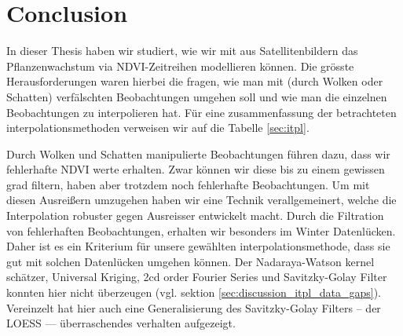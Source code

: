 \chapter{Conclusion}
\label{sec:Conclusion}

In dieser Thesis haben wir studiert, wie wir mit aus Satellitenbildern das Pflanzenwachstum via NDVI-Zeitreihen modellieren können. Die grösste Herausforderungen waren hierbei die fragen, wie man mit (durch Wolken oder Schatten) verfälschten Beobachtungen umgehen soll und wie man die einzelnen Beobachtungen zu interpolieren hat. 
Für eine zusammenfassung der betrachteten interpolationsmethoden verweisen wir auf die Tabelle \ref{sec:itpl}. 

    Durch Wolken und Schatten manipulierte Beobachtungen führen dazu, dass wir fehlerhafte NDVI werte erhalten. Zwar können wir diese bis zu einem gewissen grad filtern, haben aber trotzdem noch fehlerhafte Beobachtungen. Um mit diesen Ausreißern umzugehen haben wir eine Technik verallgemeinert, welche die Interpolation robuster gegen Ausreisser entwickelt macht.
    Durch die Filtration von fehlerhaften Beobachtungen, erhalten wir besonders im Winter Datenlücken. Daher ist es ein Kriterium für unsere gewählten interpolationsmethode, dass sie gut mit solchen Datenlücken umgehen können. Der Nadaraya-Watson kernel schätzer, Universal Kriging, 2cd order Fourier Series und Savitzky-Golay Filter konnten hier nicht überzeugen (vgl. sektion \ref{sec:discussion_itpl_data_gaps}). Vereinzelt hat hier auch eine Generalisierung des Savitzky-Golay Filters -- der LOESS --- überraschendes verhalten aufgezeigt.  
